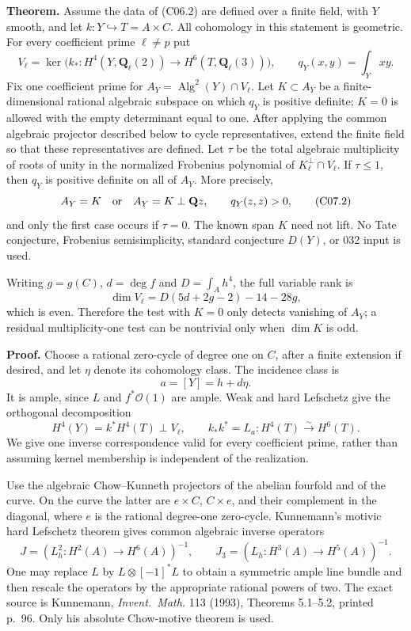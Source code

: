 \documentclass[11pt]{article}
\theoremstyle{remark}\newtheorem{remark}[theorem]{Remark}
\begin{document}
\textbf{Theorem.}
Assume the data of (C06.2) are defined over a finite field,
with $Y$ smooth, and let $k:Y\hookrightarrow T=A\times C$.
All cohomology in this statement is geometric.
For every coefficient prime $\ell\ne p$ put
\[
 V_\ell=\ker\bigl(k_*:H^4(Y,\mathbf Q_\ell(2))
                         \to H^6(T,\mathbf Q_\ell(3))\bigr),
 \qquad q_Y(x,y)=\int_Yxy.                                  \tag{C07.1}
\]
Fix one coefficient prime for
$A_Y=\operatorname{Alg}^2(Y)\cap V_\ell$.
Let $K\subset A_Y$ be a finite-dimensional rational algebraic
subspace on which $q_Y$ is positive definite; $K=0$ is allowed
with the empty determinant equal to one.
After applying the common algebraic projector described
below to cycle representatives, extend the finite field
so that these representatives are defined.
Let $\tau$ be the total algebraic multiplicity of roots
of unity in the normalized Frobenius polynomial of
$K_\ell^\perp\cap V_\ell$.
If $\tau\le1$, then $q_Y$ is positive definite on all of
$A_Y$. More precisely,
\[
 A_Y=K\quad\hbox{or}\quad A_Y=K\perp\mathbf Qz,\qquad q_Y(z,z)>0,
                                                               \tag{C07.2}
\]
and only the first case occurs if $\tau=0$.
The known span $K$ need not lift.
No Tate conjecture, Frobenius semisimplicity, standard
conjecture $D(Y)$, or 032 input is used.

Writing $g=g(C)$, $d=\deg f$ and $D=\int_A h^4$,
the full variable rank is
\[
                  \dim V_\ell=D(5d+2g-2)-14-28g,
                                                               \tag{C07.3}
\]
which is even. Therefore the test with $K=0$ only detects
vanishing of $A_Y$; a residual multiplicity-one test can
be nontrivial only when $\dim K$ is odd.

\textbf{Proof.}
Choose a rational zero-cycle of degree one on $C$, after
a finite extension if desired, and let $\eta$ denote its
cohomology class. The incidence class is
\[
                          a=[Y]=h+d\eta.
                                                               \tag{C07.4}
\]
It is ample, since $L$ and $f^*\mathcal O(1)$ are ample.
Weak and hard Lefschetz give the orthogonal decomposition
\[
                    H^4(Y)=k^*H^4(T)\perp V_\ell,
 \qquad k_*k^*=L_a:H^4(T)\xrightarrow{\sim}H^6(T).
                                                               \tag{C07.5}
\]
We give one inverse correspondence valid for every
coefficient prime, rather than assuming kernel membership
is independent of the realization.

Use the algebraic Chow--Kunneth projectors of the abelian
fourfold and of the curve. On the curve the latter are
$e\times C$, $C\times e$, and their complement in the
diagonal, where $e$ is the rational degree-one zero-cycle.
Kunnemann's motivic hard Lefschetz theorem gives common
algebraic inverse operators
\[
 J=(L_h^2:H^2(A)\to H^6(A))^{-1},\qquad
 J_3=(L_h:H^3(A)\to H^5(A))^{-1}.                            \tag{C07.6}
\]
One may replace $L$ by $L\otimes[-1]^*L$ to obtain a
symmetric ample line bundle and then rescale the operators
by the appropriate rational powers of two.
The exact source is Kunnemann, \emph{Invent.\ Math.}
113 (1993), Theorems 5.1--5.2, printed p.~96.
Only his absolute Chow-motive theorem is used.
\end{document}
